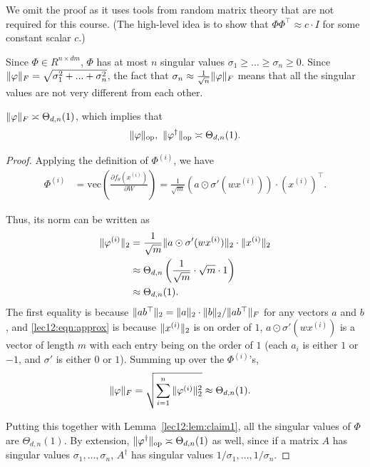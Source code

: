 We omit the proof as it uses tools from random matrix theory that are not required for this course. (The high-level idea is to show that $\Phi \Phi^\top \approx c \cdot I$ for some constant scalar $c$.)

\begin{remark}
Since $\Phi \in R^{n \times dm}$, $\Phi$ has at most $n$ singular values $\sigma_1 \geq \ldots \geq \sigma_n \geq 0$. Since $\|\varphi\|_F = \sqrt{\sigma_1^2 + ... + \sigma_n^2}$, the fact that $\sigma_n \approx \frac{1}{\sqrt{n}} \|\varphi\|_F$ means that all the singular values are not very different from each other.
\end{remark}

\begin{lemma}\label{lec12:lem:phi-norm}
$\|\varphi\|_F \asymp \Theta_{d,n}(1)$, which implies that
\begin{equation}
\|\varphi\|_{\text{op}}, \ \|\varphi^\dagger\|_{\text{op}}  \asymp \Theta_{d,n}(1).
\end{equation}
\end{lemma}

\begin{proof}
Applying the definition of $\Phi^{(i)}$, we have 
\begin{align}
    \Phi^{(i)} &= \text{vec}\left(\frac{\partial f_{\theta}(x^{(i)})}{\partial W}\right) = \frac{1}{\sqrt{m}} (a \odot \sigma' (w x^{(i)})) \cdot \left(x^{(i)}\right)^\top.
\end{align}

Thus, its norm can be written as
\begin{align}
\|\varphi^{(i)}\|_2 &= \frac{1}{\sqrt{m}} \|a \odot \sigma' (w x^{(i)})\|_2 \cdot \|x^{(i)}\|_2  \\
&\approx \Theta_{d,n}\left(\frac{1}{\sqrt{m}} \cdot \sqrt{m} \cdot 1 \right) \label{lec12:eqn:approx} \\
&\approx \Theta_{d,n}(1).
\end{align}
The first equality is because $\|ab^\top\|_2 = \|a\|_2 \cdot \|b\|_2 / \|ab^\top\|_F$ for any vectors $a$ and $b$, and \eqref{lec12:eqn:approx} is because $\|x^{(i)}\|_2$ is on order of $1$, $a \odot \sigma' (w x^{(i)})$ is a vector of length $m$ with each entry being on the order of $1$ (each $a_i$ is either $1$ or $-1$, and $\sigma'$ is either $0$ or $1$). Summing up over the $\Phi^{(i)}$'s,
\begin{align}
\|\varphi\|_F &= \sqrt{\sum_{i=1}^n \|\varphi^{(i)}\|_2^2} \approx \Theta_{d,n}(1).
\end{align}

Putting this together with Lemma~\ref{lec12:lem:claim1}, all the singular values of $\Phi$ are $\Theta_{d,n}(1)$. By extension,  $\|\varphi^\dagger\|_{\text{op}} \asymp \Theta_{d,n}(1)$ as well, since if a matrix $A$ has singular values $\sigma_1, \dots,\sigma_n$, $A^\dagger$ has singular values $1 / \sigma_1, \dots,1/\sigma_n$. 
\end{proof}

